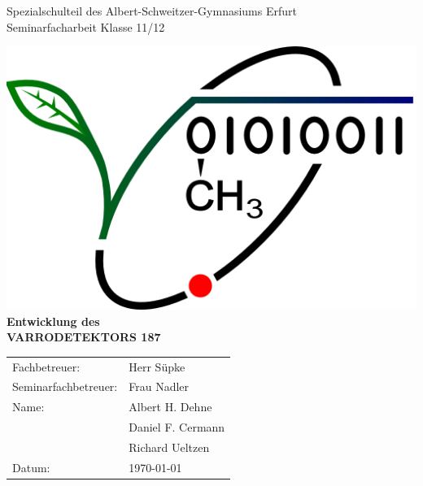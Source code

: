 \documentclass[11pt,a4paper]{article}
\begin{document}
\sloppy 			%

\begin{center}
\Large{Spezialschulteil des Albert-Schweitzer-Gymnasiums Erfurt}\\[1.5ex]
\large{Seminarfacharbeit Klasse 11/12}
\end{center}
\normalsize


\thispagestyle{empty}
\vspace*{2cm} %
\begin{center}
\includegraphics[scale=.4]{images/logo}\\
\vspace*{2cm}
\Huge{\textbf{Entwicklung des \\VARRODETEKTORS 187}} 

\end{center}
\normalsize

\vspace*{4cm}
\Large{ %
\begin{tabular}{ll}
Fachbetreuer: & Herr Süpke \\
Seminarfachbetreuer: & Frau Nadler \\

Name: & Albert H. Dehne \\
& Daniel F. Cermann\\
& Richard Ueltzen\\

Datum: & \today
\end{tabular}
}
\normalsize %

\newpage

\thispagestyle{empty}
\setcounter{page}{1}
\tableofcontents
\newpage
\end{document}

